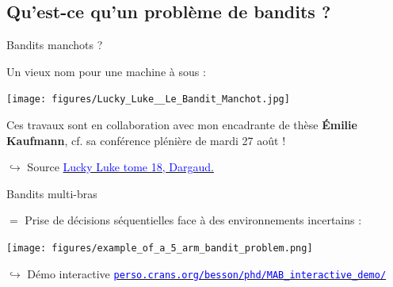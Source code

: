 \documentclass[11pt,french,ignorenonframetext,]{beamer}
\begin{document}
\subsection{\hfill{}Qu'est-ce qu'un problème de bandits ?\hfill{}}

\begin{frame}{Bandits manchots ?}

  Un vieux nom pour une machine à sous :

  \begin{center}
    \texttt{[image: figures/Lucky\_Luke\_\_Le\_Bandit\_Manchot.jpg]}
  \end{center}

  Ces travaux sont en collaboration avec mon encadrante de thèse \textbf{Émilie Kaufmann}, cf. sa conférence plénière de mardi 27 août !

  \begin{tiny}
  $\hookrightarrow$ Source
    \href{https://www.dargaud.com/bd/LUCKY-LUKE/Lucky-Luke/Lucky-Luke-tome-18-Bandit-manchot-Le}{\textcolor{blue}{Lucky Luke tome 18, \textcopyright{} Dargaud.}}
  \end{tiny}

\end{frame}


\begin{frame}{Bandits multi-bras}

  $=$ Prise de décisions séquentielles face à des environnements incertains :

  \begin{center}
    \texttt{[image: figures/example\_of\_a\_5\_arm\_bandit\_problem.png]}
  \end{center}

  \begin{tiny}
  $\hookrightarrow$ Démo interactive
    \href{https://perso.crans.org/besson/phd/MAB_interactive_demo/}{\textcolor{blue}{\texttt{perso.crans.org/besson/phd/MAB\_interactive\_demo/}}}
  \end{tiny}

\end{frame}
\end{document}
